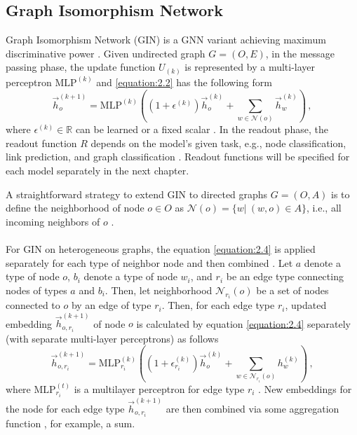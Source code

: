 \subsection{Graph Isomorphism Network} \label{graph Isomorphism network}
Graph Isomorphism Network (GIN) is a GNN variant achieving maximum discriminative power \cite{DBLP:journals/corr/abs-1810-00826}. Given undirected graph $G = (O, E)$, in the message passing phase, the update function $U_{(k)}$ is represented by a multi-layer perceptron $\text{MLP}^{(k)}$ and \ref{equation:2.2} has the following form \cite{DBLP:journals/corr/abs-1810-00826}
\begin{equation} \label{equation:2.4}
	\vec{h}_o^{(k+1)} = \text{MLP}^{(k)} \left ( \left ( 1 + \epsilon^{(k)} \right ) \vec{h}_o^{(k)} + \sum_{w\in \mathcal{N}(o)} \vec{h}_w^{(k)} \right ) \, ,
\end{equation}
where $\epsilon^{(k)} \in \mathbb{R}$ can be learned or a fixed scalar \cite{DBLP:journals/corr/abs-1810-00826}. In the readout phase, the readout function $R$ depends on the model's given task, e.g., node classification, link prediction, and graph classification \cite{DBLP:journals/corr/abs-1810-00826}. Readout functions will be specified for each model separately in the next chapter.
\par
A straightforward strategy to extend GIN to directed graphs $G = (O, A)$ is to define the neighborhood of node $o \in O$ as $\mathcal{N}(o) = \{ w | \ (w, o) \in A\}$, i.e., all incoming neighbors of $o$ \cite{zhang2020learning}.\\
\\
For GIN on heterogeneous graphs, the equation \ref{equation:2.4} is applied separately for each type of neighbor node and then combined \cite{10226873, pytorch_hetero_conv}. Let $a$ denote a type of node $o$, $b_i$ denote a type of node $w_i$, and $r_i$ be an edge type connecting nodes of types $a$ and $b_i$. Then, let neighborhood $\mathcal{N}_{r_i}(o)$ be a set of nodes connected to $o$ by an edge of type $r_i$. Then, for each edge type $r_i$, updated embedding $\vec{h}_{o, r_i}^{(k+1)}$ of node $o$ is calculated by equation \ref{equation:2.4} separately (with separate multi-layer perceptrons) as follows \cite{pytorch_hetero_conv}
\begin{equation} \label{equation:2.5}
	\vec{h}_{o, r_i}^{(k+1)} = \text{MLP}^{(k)}_{r_i} \left ( \left ( 1 + \epsilon_{r_i}^{(k)} \right ) \vec{h}_{o}^{(k)} + \sum_{w\in \mathcal{N}_{r_i}(o)} h_{w}^{(k)} \right ) \, ,
\end{equation}
where $\text{MLP}^{(t)}_{r_i}$ is a multilayer perceptron for edge type $r_i$ \cite{pytorch_hetero_conv}. New embeddings for the node for each edge type $\vec{h}_{o, r_i}^{(k+1)}$ are then combined via some aggregation function \cite{pytorch_hetero_conv}, for example, a sum.

